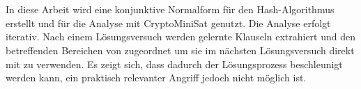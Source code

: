 \section*{\abstractname}

In diese Arbeit wird eine konjunktive Normalform für den Hash-Algorithmus  erstellt und für
die Analyse mit CryptoMiniSat genutzt. Die Analyse erfolgt iterativ. Nach einem Lösungsversuch werden
gelernte Klauseln extrahiert und den betreffenden Bereichen von  zugeordnet um sie im nächsten
Lösungsversuch direkt mit zu verwenden. Es zeigt sich, dass dadurch der Lösungsprozess beschleunigt
werden kann, ein praktisch relevanter Angriff jedoch nicht möglich ist.